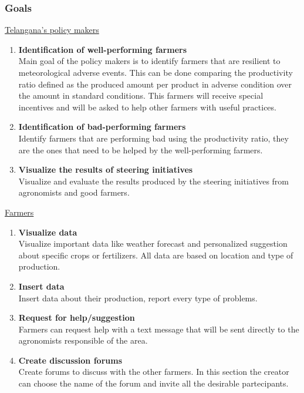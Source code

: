 \documentclass[table, 12pt]{article}
\begin{document}
\subsubsection{Goals}
\underline{Telangana's policy makers}
\begin{enumerate}
    \item \textbf{Identification of well-performing farmers}\\
    Main goal of the policy makers is to identify farmers that are resilient to meteorological adverse events.
    This can be done comparing the productivity ratio defined as the produced amount per product in adverse condition over the amount in standard conditions.
    This farmers will receive special incentives and will be asked to help other farmers 
    with useful practices.
    \item \textbf{Identification of bad-performing farmers}\\
    Identify farmers that are performing bad using the productivity ratio, they are the ones that need to be helped 
    by the well-performing farmers.
    \item \textbf{Visualize the results of steering initiatives}\\
    Visualize and evaluate the results produced by the steering initiatives from agronomists and good farmers.
\end{enumerate}

\underline{Farmers}
\begin{enumerate}
    \item \textbf{Visualize data}\\
    Visualize important data like weather forecast and personalized suggestion about specific crops or fertilizers.
    All data are based on location and type of production.
    \item \textbf{Insert data}\\
    Insert data about their production, report every type of problems.
    \item \textbf{Request for help/suggestion}\\
    Farmers can request help with a text message that will be sent directly to the agronomists responsible of the area.
    \item \textbf{Create discussion forums}\\
    Create forums to discuss with the other farmers.
    In this section the creator can choose the name of the forum and invite all the desirable partecipants.
\end{enumerate}
\end{document}
